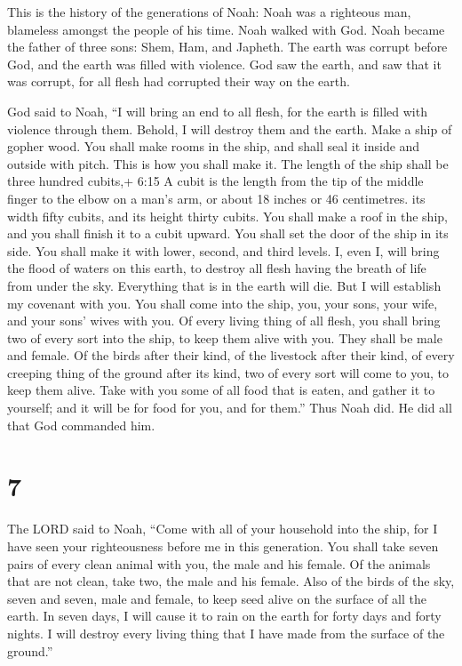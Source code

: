  This is the history of the generations of Noah: Noah was a
righteous man, blameless amongst the people of his time. Noah walked
with God.  Noah became the father of three sons: Shem, Ham,
and Japheth.  The earth was corrupt before God, and the
earth was filled with violence.  God saw the earth, and saw
that it was corrupt, for all flesh had corrupted their way on the earth.

 God said to Noah, ``I will bring an end to all flesh, for
the earth is filled with violence through them. Behold, I will destroy
them and the earth.  Make a ship of gopher wood. You shall
make rooms in the ship, and shall seal it inside and outside with pitch.
 This is how you shall make it. The length of the ship
shall be three hundred cubits,+ 6:15 A cubit is the length from the tip
of the middle finger to the elbow on a man's arm, or about 18 inches or
46 centimetres. its width fifty cubits, and its height thirty cubits.
 You shall make a roof in the ship, and you shall finish it
to a cubit upward. You shall set the door of the ship in its side. You
shall make it with lower, second, and third levels.  I,
even I, will bring the flood of waters on this earth, to destroy all
flesh having the breath of life from under the sky. Everything that is
in the earth will die.  But I will establish my covenant
with you. You shall come into the ship, you, your sons, your wife, and
your sons' wives with you.  Of every living thing of all
flesh, you shall bring two of every sort into the ship, to keep them
alive with you. They shall be male and female.  Of the
birds after their kind, of the livestock after their kind, of every
creeping thing of the ground after its kind, two of every sort will come
to you, to keep them alive.  Take with you some of all food
that is eaten, and gather it to yourself; and it will be for food for
you, and for them.''  Thus Noah did. He did all that God
commanded him.

\hypertarget{section-6}{%
\section{7}\label{section-6}}

 The LORD said to Noah, ``Come with all of your household
into the ship, for I have seen your righteousness before me in this
generation.  You shall take seven pairs of every clean
animal with you, the male and his female. Of the animals that are not
clean, take two, the male and his female.  Also of the birds
of the sky, seven and seven, male and female, to keep seed alive on the
surface of all the earth.  In seven days, I will cause it to
rain on the earth for forty days and forty nights. I will destroy every
living thing that I have made from the surface of the ground.''

